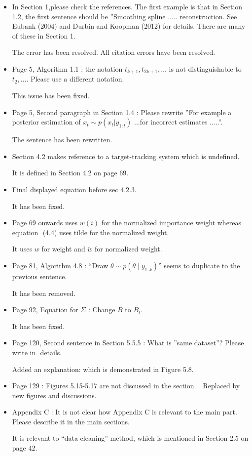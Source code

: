 \documentclass[a4paper,18pt]{extarticle}
\begin{document}
\begin{itemize}
	\item In Section 1,please check the references. The first example is that in Section 1.2, the first sentence should be ”Smoothing spline ..... reconstruction. See Eubank (2004) and Durbin and Koopman (2012) for details. There are many of these in Section 1.  
	
	The error has been resolved. All citation errors have been resolved. 
	
	\item  Page 5, Algorithm 1.1 : the notation $t_{k+1}, t_{2k+1},\ldots$ is not distinguishable to $t_2, \ldots$. Please use a different notation.  
	
	This issue has been fixed.
	
	\item  Page 5, Second paragraph in Section 1.4 : Please rewrite ”For example a posterior estimation of $x_t\sim p(x_t|y_{1:t})$ ...for incorrect estimates .....”.  
	
	The sentence has been rewritten.
	
	
	\item  Section 4.2 makes reference to a target-tracking system which is undefined.
	
	It is defined in Section 4.2 on page 69. 	
	
	\item  Final displayed equation before sec 4.2.3.
	
	It has been fixed. 	
	
	\item Page 69 onwards uses $w(i)$ for the normalized importance weight whereas equation  (4.4) uses tilde for the normalized weight.
	
	It uses $w$ for weight and $\tilde{w}$ for normalized weight.
	
 	\item Page 81, Algorithm 4.8 : ``Draw $\theta \sim p(\theta\mid y_{1:k})$'' seems to duplicate to the previous sentence.  
 	
 	It has been removed.
 	
 	\item Page 92, Equation for $\Sigma$ : Change $B$ to $B_t$.  
 	
 	It has been fixed. 
 	
 	\item Page 120, Second sentence in Section 5.5.5 : What is ”same dataset”? Please write in  details.  
 	
 	Added an explanation: which is demonstrated in Figure 5.8.
 	
 	\item Page 129 : Figures 5.15-5.17 are not discussed in the section.  
 	Replaced by new figures and discussions. 
 	
 	\item  Appendix C : It is not clear how Appendix C is relevant to the main part. Please describe it in the main sections.  
 	
 	It is relevant to ``data cleaning'' method, which is mentioned in Section 2.5 on page 42.
 	


\end{itemize}
\end{document}
